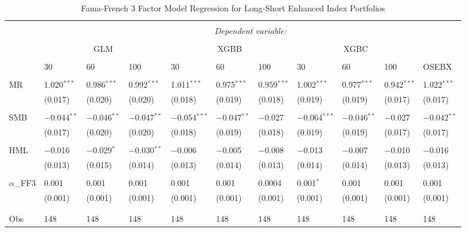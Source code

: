 \begin{table}[H] \centering 
  \caption{Fama-French 3 Factor Model Regression for Long-Short Enhanced Index Portfolios} 
  \subcaption*{}
  \label{} 
\begin{tabularx}{\textwidth}{XXXXXXXXXXl} 
\\[-1.8ex]\hline 
\hline \\[-1.8ex] 
 & \multicolumn{10}{c}{\textit{Dependent variable:}} \\ 
\cline{2-11} 
\\[-1.8ex] 
 & \multicolumn{3}{c}{GLM} & \multicolumn{3}{c}{XGBB} & \multicolumn{3}{c}{XGBC} & \\
 \cline{2-10}
 \\[-1.8ex] 
 & 30 & 60 & 100 & 30 & 60 & 100 & 30 & 60 & 100 & OSEBX \\ 
 \cline{2-10} \\
 MR & 1.020$^{***}$ & 0.986$^{***}$ & 0.992$^{***}$ & 1.011$^{***}$ & 0.975$^{***}$ & 0.959$^{***}$ & 1.002$^{***}$ & 0.977$^{***}$ & 0.942$^{***}$ & 1.022$^{***}$ \\ 
  & (0.017) & (0.020) & (0.020) & (0.018) & (0.019) & (0.018) & (0.019) & (0.019) & (0.017) & (0.017) \\ 
  & & & & & & & & & & \\ 
 SMB & $-$0.044$^{**}$ & $-$0.046$^{**}$ & $-$0.047$^{**}$ & $-$0.054$^{***}$ & $-$0.047$^{**}$ & $-$0.027 & $-$0.064$^{***}$ & $-$0.046$^{**}$ & $-$0.027 & $-$0.042$^{**}$ \\ 
  & (0.017) & (0.020) & (0.020) & (0.018) & (0.019) & (0.018) & (0.019) & (0.019) & (0.017) & (0.017) \\ 
  & & & & & & & & & & \\ 
 HML & $-$0.016 & $-$0.029$^{*}$ & $-$0.030$^{**}$ & $-$0.006 & $-$0.005 & $-$0.008 & $-$0.013 & $-$0.007 & $-$0.010 & $-$0.016 \\ 
  & (0.013) & (0.015) & (0.014) & (0.013) & (0.014) & (0.013) & (0.014) & (0.014) & (0.013) & (0.013) \\ 
  & & & & & & & & & & \\ 
 $\alpha$_{FF3} & 0.001 & 0.001 & 0.001 & 0.001 & 0.001 & 0.0004 & 0.001$^{*}$ & 0.001 & 0.001 & 0.001 \\ 
  & (0.001) & (0.001) & (0.001) & (0.001) & (0.001) & (0.001) & (0.001) & (0.001) & (0.001) & (0.001) \\ 
  & & & & & & & & & & \\ 
\hline \\[-1.8ex] 
Obs & 148 & 148 & 148 & 148 & 148 & 148 & 148 & 148 & 148 & 148 \\ 

\end{tabularx}
\end{table}
